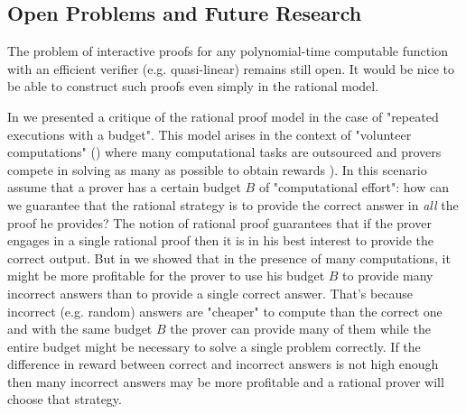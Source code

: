 {\begin{comment}
The cost models presented in our work could be extended by considering different type of cost functions, such as the ones in \cite{halpern2011don}. For example, we assume a cost function that is linear in the number of steps (transitions) carried out. A different approach could consider non-linear cost functions. What assumptions would be required to prove sequential composability when the cost of the computation increases, say, quadratically in the number of steps? 
And what are plausible cost functions in the real world?
\end{comment}




\subsection{Open Problems and Future Research}


The problem of interactive proofs for any polynomial-time computable function with an efficient verifier (e.g. quasi-linear) remains still open. It would be nice to be able to construct such proofs even simply in the rational model. 

\medskip
\noindent
In \cite{cg15} we presented a critique of the rational proof model in the case of "repeated executions with a budget". This model arises in the context of "volunteer computations" (\cite{seti,folding}) where many computational tasks are outsourced and provers compete in solving as many as possible to obtain rewards ). In this scenario assume that a prover has a certain budget $B$ of "computational effort": how can we guarantee that the rational strategy is to provide the correct answer in {\em all} the proof he provides? The notion of rational proof guarantees that if the prover engages in a single rational proof then it is in his best interest to provide the correct output. But in \cite{cg15} we showed that in the presence of many computations, it might be more profitable for the prover to use his budget $B$ to provide many incorrect answers than to provide a single correct answer. That's because incorrect (e.g. random) answers are "cheaper" to compute than the correct one and with the same budget $B$ the prover can provide many of them while the entire budget might be necessary to solve a single problem correctly. If the difference in reward between correct and incorrect answers is not high enough then many incorrect answers may be more profitable and a rational prover will choose that strategy. 

}
